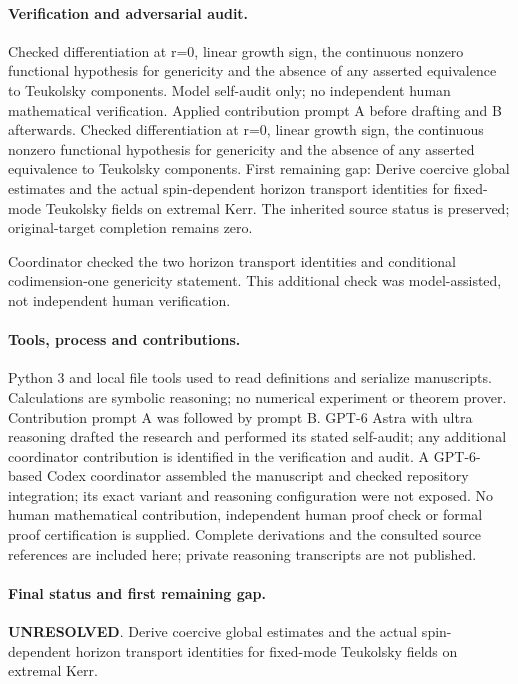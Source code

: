 \documentclass[11pt]{article}
\begin{document}
\paragraph{Verification and adversarial audit.}
Checked differentiation at r=0, linear growth sign, the continuous nonzero functional hypothesis for genericity and the absence of any asserted equivalence to Teukolsky components. Model self-audit only; no independent human mathematical verification. Applied contribution prompt A before drafting and B afterwards. Checked differentiation at r=0, linear growth sign, the continuous nonzero functional hypothesis for genericity and the absence of any asserted equivalence to Teukolsky components. First remaining gap: Derive coercive global estimates and the actual spin-dependent horizon transport identities for fixed-mode Teukolsky fields on extremal Kerr. The inherited source status is preserved; original-target completion remains zero.

Coordinator checked the two horizon transport identities and conditional codimension-one genericity statement. This additional check was model-assisted, not independent human verification.

\paragraph{Tools, process and contributions.}
Python 3 and local file tools used to read definitions and serialize manuscripts. Calculations are symbolic reasoning; no numerical experiment or theorem prover. Contribution prompt A was followed by prompt B. GPT-6 Astra with ultra reasoning drafted the research and performed its stated self-audit; any additional coordinator contribution is identified in the verification and audit. A GPT-6-based Codex coordinator assembled the manuscript and checked repository integration; its exact variant and reasoning configuration were not exposed. No human mathematical contribution, independent human proof check or formal proof certification is supplied. Complete derivations and the consulted source references are included here; private reasoning transcripts are not published.

\paragraph{Final status and first remaining gap.}
\textbf{UNRESOLVED}. Derive coercive global estimates and the actual spin-dependent horizon transport identities for fixed-mode Teukolsky fields on extremal Kerr.
\end{document}
